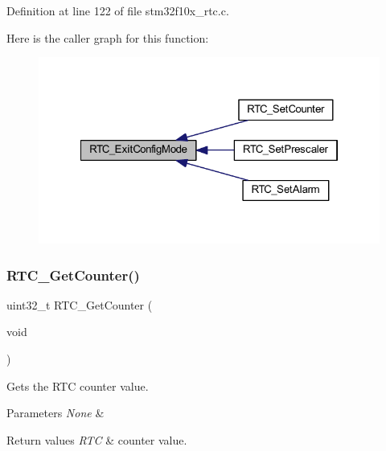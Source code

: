 Definition at line 122 of file stm32f10x\+\_\+rtc.\+c.

Here is the caller graph for this function\+:
\nopagebreak
\begin{figure}[H]
\begin{center}
\leavevmode
\includegraphics[width=322pt]{group___r_t_c___private___functions_ga7585aa6e2dbb497173b2fd03bac0d304_icgraph}
\end{center}
\end{figure}
\mbox{\label{group___r_t_c___private___functions_ga6edb19a0ad8414a40610341121c5ea6c}} 
\subsubsection{\texorpdfstring{R\+T\+C\+\_\+\+Get\+Counter()}{RTC\_GetCounter()}}
{\footnotesize\ttfamily uint32\+\_\+t R\+T\+C\+\_\+\+Get\+Counter (\begin{DoxyParamCaption}\item[{void}]{ }\end{DoxyParamCaption})}



Gets the R\+TC counter value. 


\begin{DoxyParams}{Parameters}
{\em None} & \\
\hline
\end{DoxyParams}

\begin{DoxyRetVals}{Return values}
{\em R\+TC} & counter value. \\
\hline
\end{DoxyRetVals}


